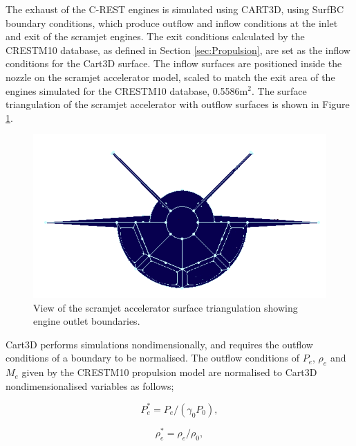 The exhaust of the C-REST engines is simulated using CART3D, using SurfBC boundary conditions, which produce outflow and inflow conditions at the inlet and exit of the scramjet engines\cite{Pandya2004}. The exit conditions calculated by the \textsf{CRESTM10} database, as defined in Section \ref{sec:Propulsion}, are set as the inflow conditions for the Cart3D surface. 
The inflow surfaces are positioned inside the nozzle on the scramjet accelerator model, scaled to match the exit area of the engines simulated for the \textsf{CRESTM10} database, 0.5586m$^2$. The surface triangulation of the scramjet accelerator with outflow surfaces is shown in Figure \ref{fig:Pointwise-EngineBC}.
\begin{figure}[ht]
	\centering
	\includegraphics[width=0.7\linewidth]{figures/3_vehicle_design/Pointwise-EngineBC}
	\caption{View of the scramjet accelerator surface triangulation showing engine outlet boundaries.}
	\label{fig:Pointwise-EngineBC}
\end{figure}
Cart3D performs simulations nondimensionally, and requires the outflow conditions of a boundary to be normalised. The outflow conditions of $P_e$, $\rho_e$ and $M_e$ given by the \textsf{CRESTM10 }propulsion model are normalised to Cart3D nondimensionalised variables as follows\cite{Cartplumes,Mehta2015};

\begin{equation}
P_e^* = P_e/(\gamma_0 P_0),
\end{equation}

\begin{equation}
\rho_e^* = \rho_e/\rho_0,
\end{equation}

